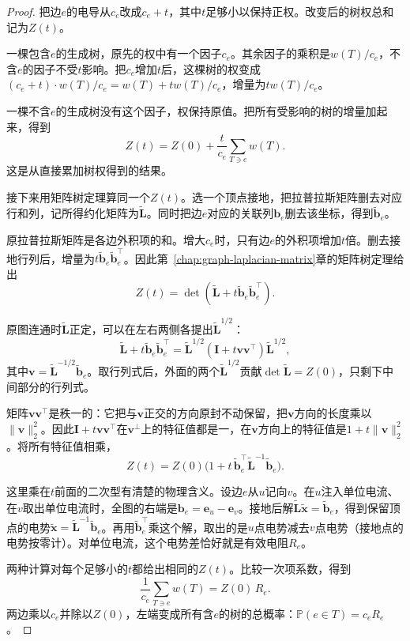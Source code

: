 \begin{proof}
把边$e$的电导从$c_e$改成$c_e+t$，其中$t$足够小以保持正权。改变后的树权总和记为$Z(t)$。

一棵包含$e$的生成树，原先的权中有一个因子$c_e$。其余因子的乘积是$w(T)/c_e$，不含$e$的因子不受$t$影响。把$c_e$增加$t$后，这棵树的权变成$(c_e+t)\cdot w(T)/c_e=w(T)+tw(T)/c_e$，增量为$tw(T)/c_e$。

一棵不含$e$的生成树没有这个因子，权保持原值。把所有受影响的树的增量加起来，得到
\[
Z(t)=Z(0)+\frac{t}{c_e}\sum_{T\ni e}w(T).
\]
这是从直接累加树权得到的结果。

接下来用矩阵树定理算同一个$Z(t)$。选一个顶点接地，把拉普拉斯矩阵删去对应行和列，记所得约化矩阵为$\widetilde{\bm L}$。同时把边$e$对应的关联列$\bm b_e$删去该坐标，得到$\tilde{\bm b}_e$。

原拉普拉斯矩阵是各边外积项的和。增大$c_e$时，只有边$e$的外积项增加$t$倍。删去接地行列后，增量为$t\tilde{\bm b}_e\tilde{\bm b}_e^\top$。因此第~\ref{chap:graph-laplacian-matrix}章的矩阵树定理给出
\[
Z(t)=\det(\widetilde{\bm L}+t\tilde{\bm b}_e\tilde{\bm b}_e^\top).
\]

原图连通时$\widetilde{\bm L}$正定，可以在左右两侧各提出$\widetilde{\bm L}^{1/2}$：
\[
\widetilde{\bm L}+t\tilde{\bm b}_e\tilde{\bm b}_e^\top
=\widetilde{\bm L}^{1/2}
  (\bm I+t\bm v\bm v^\top)\widetilde{\bm L}^{1/2},
\]
其中$\bm v=\widetilde{\bm L}^{-1/2}\tilde{\bm b}_e$。取行列式后，外面的两个$\widetilde{\bm L}^{1/2}$贡献$\det\widetilde{\bm L}=Z(0)$，只剩下中间部分的行列式。

矩阵$\bm v\bm v^\top$是秩一的：它把与$\bm v$正交的方向原封不动保留，把$\bm v$方向的长度乘以$\lVert\bm v\rVert_2^2$。因此$\bm I+t\bm v\bm v^\top$在$\bm v^\perp$上的特征值都是一，在$\bm v$方向上的特征值是$1+t\lVert\bm v\rVert_2^2$。将所有特征值相乘，
\[
Z(t)=Z(0)\bigl(1+t\,\tilde{\bm b}_e^\top\widetilde{\bm L}^{-1}\tilde{\bm b}_e\bigr).
\]

这里乘在$t$前面的二次型有清楚的物理含义。设边$e$从$u$记向$v$。在$u$注入单位电流、在$v$取出单位电流时，全图的右端是$\bm b_e=\bm e_u-\bm e_v$。接地后解$\widetilde{\bm L}\tilde{\bm x}=\tilde{\bm b}_e$，得到保留顶点的电势$\tilde{\bm x}=\widetilde{\bm L}^{-1}\tilde{\bm b}_e$。再用$\tilde{\bm b}_e^\top$乘这个解，取出的是$u$点电势减去$v$点电势（接地点的电势按零计）。对单位电流，这个电势差恰好就是有效电阻$R_e$。

两种计算对每个足够小的$t$都给出相同的$Z(t)$。比较一次项系数，得到
\[
\frac{1}{c_e}\sum_{T\ni e}w(T)=Z(0)\,R_e.
\]
两边乘以$c_e$并除以$Z(0)$，左端变成所有含$e$的树的总概率：$\mathbb P(e\in T)=c_eR_e$。
\end{proof}

